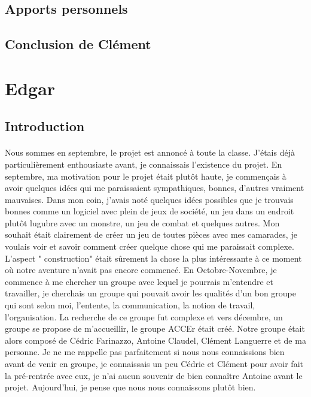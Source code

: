 \documentclass[titlepage, 13px, a4paper]{report}
\begin{document}
\subsection{Apports personnels}
\paragraph{} \hspace{0pt}

\subsection{Conclusion de Clément}
\paragraph{} \hspace{0pt}


\newpage
\section{Edgar}

\subsection{Introduction}

\paragraph{} \hspace{0pt}
Nous sommes en septembre, le projet est annoncé à toute la classe. 
J’étais déjà particulièrement enthousiaste avant, je connaissais l’existence du projet. 
En septembre, ma motivation pour le projet était plutôt haute, je commençais à avoir quelques idées 
qui me paraissaient sympathiques, bonnes, d’autres vraiment mauvaises. Dans mon coin, 
j’avais noté quelques idées possibles que je trouvais bonnes comme un logiciel avec plein de jeux de société, 
un jeu dans un endroit plutôt lugubre avec un monstre, un jeu de combat et quelques autres. 
Mon souhait était clairement de créer un jeu de toutes pièces avec mes camarades, 
je voulais voir et savoir comment créer quelque chose qui me paraissait complexe. 
L’aspect " construction"  était sûrement la chose la plus intéressante à ce moment où notre aventure 
n’avait pas encore commencé. En Octobre-Novembre, je commence à me chercher un groupe avec lequel je pourrais 
m’entendre et travailler, je cherchais un groupe qui pouvait avoir les qualités d’un bon groupe 
qui sont selon moi, l’entente, la communication, la notion de travail, l’organisation. 
La recherche de ce groupe fut complexe et vers décembre, un groupe se propose de m’accueillir, 
le groupe ACCEr était créé. Notre groupe était alors composé de Cédric Farinazzo, Antoine Claudel, 
Clément Languerre et de ma personne. Je ne me rappelle pas parfaitement si nous nous connaissions 
bien avant de venir en groupe, je connaissais un peu Cédric et Clément pour avoir fait 
la pré-rentrée avec eux, je n’ai aucun souvenir de bien connaître Antoine avant le projet. 
Aujourd’hui, je pense que nous nous connaissons plutôt bien. \\
\end{document}
